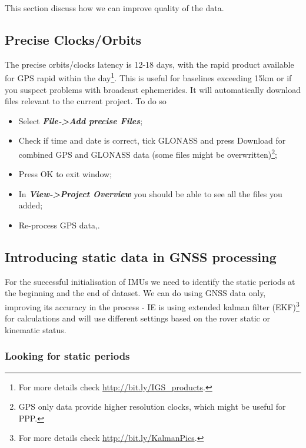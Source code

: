 \documentclass[11pt,fleqn]{book} %
\newcommand{\moreInfo}[1]{\footnote{For more details check \url{#1}.}}
\begin{document}
This section discuss how we can improve quality of the data.


\subsection{Precise Clocks/Orbits}

The precise orbits/clocks latency is 12-18 days, with the rapid product available for GPS rapid within the day\moreInfo{http://bit.ly/IGS_products}. This is useful for baselines exceeding 15km or if you suspect problems with broadcast ephemerides. It will automatically download files relevant to the current project. To do so 

\begin{itemize}
	\item Select \textbf{\emph{File->Add precise Files}};
	\item Check if time and date is correct, tick GLONASS and press Download for combined GPS and GLONASS data (some files might be overwritten)\footnote{GPS only data provide higher resolution clocks, which might be useful for PPP.};
	\item Press OK to exit window;
	\item In \textbf{\emph{View->Project Overview}} you should be able to see all the files you added;
	\item Re-process GPS data,.
\end{itemize}


\subsection{Introducing static data in GNSS processing}

For the successful initialisation of IMUs we need to identify the static periods at the beginning and the end of dataset. We can do using GNSS data only, improving its accuracy in the process - IE is using extended kalman filter (EKF)\moreInfo{http://bit.ly/KalmanPics} for calculations and will use different settings based on the rover static or kinematic status.


\subsubsection{Looking for static periods\label{sec:Static-periods}}
\end{document}
